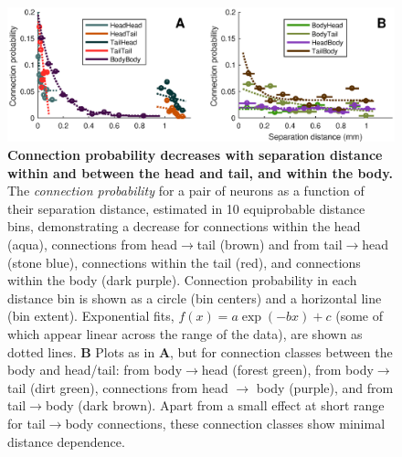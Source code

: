 \documentclass[10pt,letterpaper]{article}
\begin{document}
\begin{figure}[h]
  \centering
    \includegraphics[width=\textwidth]{connectionProbability.eps}
  \caption{
\textbf{Connection probability decreases with separation distance within and between the head and tail, and within the body.}
The \emph{connection probability} for a pair of neurons as a function of their separation distance, estimated in 10 equiprobable distance bins, demonstrating a decrease for connections within the head (aqua), connections from head$\rightarrow$tail (brown) and from tail$\rightarrow$head (stone blue), connections within the tail (red), and connections within the body (dark purple).
Connection probability in each distance bin is shown as a circle (bin centers) and a horizontal line (bin extent).
Exponential fits, $f(x) = a\exp(-bx)+c$ (some of which appear linear across the range of the data), are shown as dotted lines.
\textbf{B}
Plots as in \textbf{A}, but for connection classes between the body and head/tail: from body$\rightarrow$head (forest green), from body$\rightarrow$tail (dirt green), connections from head $\rightarrow$ body (purple), and from tail$\rightarrow$body (dark brown).
Apart from a small effect at short range for tail$\rightarrow$body connections, these connection classes show minimal distance dependence.
  }
  \label{fig:spatialEffectsMain}
\end{figure}
\end{document}

